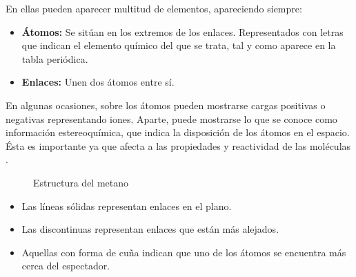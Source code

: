 \noindent En ellas pueden aparecer multitud de elementos, apareciendo siempre:
\begin{itemize}
    \item \textbf{Átomos:} Se sitúan en los extremos de los enlaces. Representados con letras que indican el elemento químico del que se trata, tal y como aparece en la tabla periódica.
    \item \textbf{Enlaces:} Unen dos átomos entre sí. 
\end{itemize}

 En algunas ocasiones, sobre los átomos pueden mostrarse cargas positivas o negativas representando iones. Aparte, puede mostrarse lo que se conoce como información estereoquímica, que indica la disposición de los átomos en el espacio. Ésta es importante ya que afecta a las propiedades y reactividad de las moléculas \cite{estereoquimica,structrep}.

 \begin{figure}[H]
\centering
    \caption{Estructura del metano} 
\end{figure}

\begin{itemize}
    \item Las líneas sólidas representan enlaces en el plano.
    \item Las discontinuas representan enlaces que están más alejados.
    \item Aquellas con forma de cuña indican que uno de los átomos se encuentra más cerca del espectador. 
\end{itemize}

